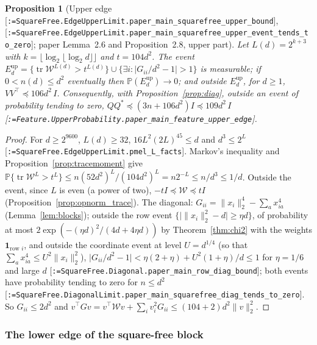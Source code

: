 \documentclass[11pt]{article}
\makeatletter
\newcommand{\formal@break}[1]{\@tfor\formal@tok:=#1\do{%
  \formal@tok
  \expandafter\ifx\formal@tok.\allowbreak\else
  \expandafter\ifx\formal@tok\_\allowbreak\fi\fi}}
\DeclareRobustCommand{\formal}[1]{\textnormal{[\texttt{\small\formal@break{#1}}]}}
\newcommand{\Prob}{\mathbb{P}}
\newcommand{\norm}[1]{\lVert #1\rVert}
\newcommand{\abs}[1]{\lvert #1\rvert}
\newcommand{\tr}{\operatorname{tr}}
\newcommand{\Id}{I}
\newcommand{\one}{\mathbf{1}}
\theoremstyle{plain}
\newtheorem{proposition}[theorem]{Proposition}
\theoremstyle{definition}
\makeatother
\begin{document}
\begin{proposition}[Upper edge \formal{SquareFree.EdgeUpperLimit.paper\_main\_squarefree\_upper\_bound}, \formal{SquareFree.EdgeUpperLimit.paper\_main\_squarefree\_upper\_event\_tends\_to\_zero}; paper Lemma~2.6 and Proposition~2.8, upper part]\label{prop:upperedge}
Let $L(d) = 2^{k+3}$ with $k = \lfloor\log_2\lfloor\log_2 d\rfloor\rfloor$ and
$t = 104d^2$. The event
$E_d^{\mathrm{up}} = \{\tr\mathcal{W}^{L(d)} > t^{L(d)}\} \cup \{\exists i : \abs{G_{ii}/d^2 - 1} > 1\}$
is measurable; if $0 < n(d) \le d^2$ eventually then $\Prob(E_d^{\mathrm{up}}) \to 0$;
and outside $E_d^{\mathrm{up}}$, for $d \ge 1$, $VV^{\top} \preceq 106d^2\,\Id$.
Consequently, with Proposition~\ref{prop:diag}, outside an event of
probability tending to zero, $QQ^{*} \preceq (3n + 106d^2)\Id \preceq 109d^2\,\Id$
\formal{Feature.UpperProbability.paper\_main\_feature\_upper\_edge}.
\end{proposition}

\begin{proof}
For $d \ge 2^{9600}$, $L(d) \ge 32$, $16L^2(2L)^{45} \le d$ and $d^3 \le 2^{L}$
\formal{SquareFree.EdgeUpperLimit.pmel\_L\_facts}. Markov's inequality and
Proposition~\ref{prop:tracemoment} give
$\Prob\{\tr\mathcal{W}^L > t^L\} \le n(52d^2)^L/(104d^2)^L = n2^{-L} \le n/d^3 \le 1/d$.
Outside the event, since $L$ is even (a power of two),
$-t\Id \preceq \mathcal{W} \preceq t\Id$ (Proposition~\ref{prop:opnorm_trace}).
The diagonal: $G_{ii} = \norm{x_i}_2^4 - \sum_ax_{ia}^4$ (Lemma~\ref{lem:blocks});
outside the row event $\{\abs{\norm{x_i}_2^2 - d} \ge \eta d\}$, of
probability at most $2\exp(-(\eta d)^2/(4d + 4\eta d))$ by Theorem~\ref{thm:chi2}
with the weights $\one_{\text{row } i}$, and outside the coordinate event at
level $U = d^{1/4}$ (so that $\sum_a x_{ia}^4 \le U^2\norm{x_i}_2^2$),
$\abs{G_{ii}/d^2 - 1} < \eta(2 + \eta) + U^2(1 + \eta)/d \le 1$ for
$\eta = 1/6$ and large $d$ \formal{SquareFree.Diagonal.paper\_main\_row\_diag\_bound};
both events have probability tending to zero for $n \le d^2$
\formal{SquareFree.DiagonalLimit.paper\_main\_squarefree\_diag\_tends\_to\_zero}.
So $G_{ii} \le 2d^2$ and $v^{\top}Gv = v^{\top}\mathcal{W}v + \sum_i v_i^2G_{ii} \le (104 + 2)d^2\norm{v}_2^2$.
\end{proof}

\subsubsection{The lower edge of the square-free block}
\end{document}
